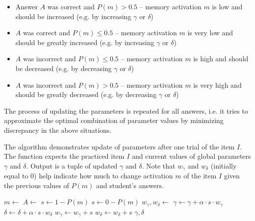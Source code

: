\begin{itemize}
  \item Answer $A$ was correct and $P(m) > 0.5$ -- memory activation $m$ is low and should be increased (e.g. by increasing $\gamma$ or $\delta$)
  \item $A$ was correct and $P(m) \leq 0.5$ -- memory activation $m$ is very low and should be greatly increased (e.g. by increasing $\gamma$ or $\delta$)
  \item $A$ was incorrect and $P(m) \leq 0.5$ -- memory activation $m$ is high and should be decreased (e.g. by decreasing $\gamma$ or $\delta$)
  \item $A$ was incorrect and $P(m) > 0.5$ -- memory activation $m$ is very high and should be greatly decreased (e.g. by decreasing $\gamma$ or $\delta$)
\end{itemize}

The process of updating the parameters is repeated for all answers, i.e. it tries to approximate the optimal combination of parameter values by minimizing discrepancy in the above situations.

\begin{algorithm}
  \caption{The algorithm demonstrates update of parameters after one trial of the item $I$. The function expects the practiced item $I$ and current values of global parameters $\gamma$ and $\delta$. Output is a tuple of updated $\gamma$ and $\delta$. Note that $w_{\gamma}$ and $w_{\delta}$ (initially equal to $0$) help indicate how much to change activation $m$ of the item $I$ given the previous values of $P(m)$ and student's answers.}
  \label{alg-gradient-descent}
  \begin{algorithmic}[1]
      \State $m \gets$  
      \State $A \gets$  
       
        \State $s \gets 1 - P(m)$
      \Else
        \State $s \gets 0 - P(m)$
      \EndIf
      \State $w_{\gamma}, w_{\delta} \gets$  
      \State $\gamma \gets \gamma + \alpha \cdot s \cdot w_{\gamma}$ 
      \State $\delta \gets \delta + \alpha \cdot s \cdot w_{\delta}$
        \State $w_{\gamma} \gets w_{\gamma} + s$
      \Else
        \State $w_{\delta} \gets w_{\delta} + s$
      \EndIf
      \State {} 
      \State \Return $\gamma, \delta$
    \EndFunction
  \end{algorithmic}
\end{algorithm}

